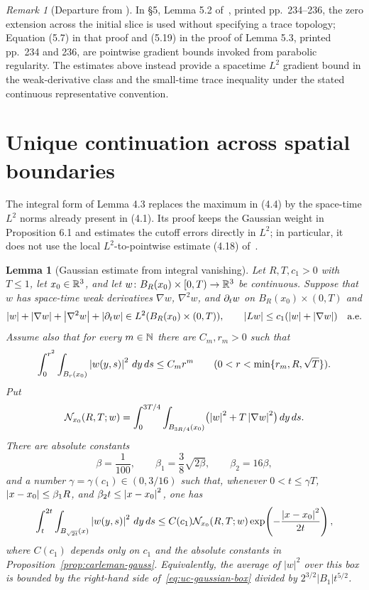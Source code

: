 \documentclass[11pt,letterpaper]{article}
\numberwithin{equation}{section}
\theoremstyle{plain}
\newtheorem{lemma}[theorem]{Lemma}
\theoremstyle{definition}
\theoremstyle{remark}
\newtheorem{remark}[theorem]{Remark}
\begin{document}
\begin{remark}[Departure from \cite{ESS2003}]
In §5, Lemma 5.2 of~\cite{ESS2003}, printed pp.~234--236, the zero extension across the initial slice is used without specifying a trace topology; Equation (5.7) in that proof and (5.19) in the proof of Lemma 5.3, printed pp.~234 and 236, are pointwise gradient bounds invoked from parabolic regularity. The estimates above instead provide a spacetime $L^2$ gradient bound in the weak-derivative class and the small-time trace inequality under the stated continuous representative convention.
\end{remark}

\section{Unique continuation across spatial boundaries}\label{sec:uc}

The integral form of Lemma 4.3 replaces the maximum in (4.4) by the
space-time $L^2$ norms already present in (4.1). Its proof keeps the Gaussian
weight in Proposition 6.1 and estimates the cutoff errors directly in $L^2$;
in particular, it does not use the local $L^2$-to-pointwise estimate (4.18)
of~\cite{ESS2003}.

\begin{lemma}[Gaussian estimate from integral vanishing]\label{lem:uc-gaussian}
Let $R,T,c_1>0$ with $T\leq1$, let $x_0\in\mathbb{R}^3$, and let
$w\colon B_R(x_0)\times[0,T)\to\mathbb{R}^3$ be continuous. Suppose that $w$ has
space-time weak derivatives $\nabla w$, $\nabla^2w$, and $\partial_t w$ on
$B_R(x_0)\times(0,T)$ and
\[
 \left\lvert w\right\rvert+\left\lvert \nabla w\right\rvert+\left\lvert \nabla^2w\right\rvert+\left\lvert \partial_t w\right\rvert
       \in L^2(B_R(x_0)\times(0,T)),\qquad
 \left\lvert L w\right\rvert\leq c_1(\left\lvert w\right\rvert+\left\lvert \nabla w\right\rvert)
 \quad\text{a.e.}
\]
Assume also that for every $m\in\mathbb{N}$ there are $C_m,r_m>0$ such that
\begin{equation}\label{eq:uc-integral-vanishing}
 \int_0^{r^2}\int_{B_r(x_0)}\left\lvert w(y,s)\right\rvert^2\,dy\,ds
       \leq C_m r^m\qquad(0<r<\min\{r_m,R,\sqrt{T}\}).
\end{equation}
Put
\[
 \mathcal N_{x_0}(R,T;w)=
 \int_0^{3T/4}\int_{B_{3R/4}(x_0)}
       \bigl(\left\lvert w\right\rvert^2+T\left\lvert \nabla w\right\rvert^2\bigr)\,dy\,ds.
\]
There are absolute constants
\[
 \beta=\frac1{100},\qquad
 \beta_1=\frac38\sqrt{2\beta},\qquad \beta_2=16\beta,
\]
and a number $\gamma=\gamma(c_1)\in(0,3/16)$ such that, whenever
$0<t\leq\gamma T$, $\left\lvert x-x_0\right\rvert\leq\beta_1R$, and
$\beta_2t\leq\left\lvert x-x_0\right\rvert^2$, one has
\begin{equation}\label{eq:uc-gaussian-box}
 \int_t^{2t}\int_{B_{\sqrt{2t}}(x)}\left\lvert w(y,s)\right\rvert^2\,dy\,ds
 \leq C(c_1)\mathcal N_{x_0}(R,T;w)
       \exp\!\left(-\frac{\left\lvert x-x_0\right\rvert^2}{2t}\right),
\end{equation}
where $C(c_1)$ depends only on $c_1$ and the absolute constants in
Proposition~\ref{prop:carleman-gauss}. Equivalently, the average of $|w|^2$
over this box is bounded by the right-hand side of~\eqref{eq:uc-gaussian-box}
divided by $2^{3/2}|B_1|t^{5/2}$.
\end{lemma}
\end{document}
